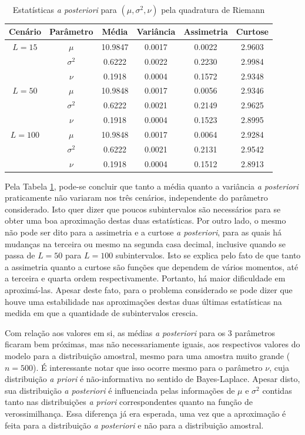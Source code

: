 \begin{table}[htb]
	\caption{Estatísticas \textit{a posteriori} para $(\mu, \sigma^2, \nu)$ pela quadratura de Riemann}
	\label{tab1}
	\centering
	\begin{tabular}{cccccc}
		\toprule
		Cenário & Parâmetro & Média & Variância & Assimetria & Curtose \\
		\midrule
		$L = 15$ & $\mu$      & 10.9847 & 0.0017 & 0.0022 & 2.9603 \\
		& $\sigma^2$ &  0.6222 & 0.0022 & 0.2230 & 2.9984 \\
		& $\nu$      &  0.1918 & 0.0004 & 0.1572 & 2.9348 \\
		\midrule
		$L = 50$ & $\mu$      & 10.9848 & 0.0017 & 0.0056 & 2.9346 \\
		& $\sigma^2$ &  0.6222 & 0.0021 & 0.2149 & 2.9625 \\
		& $\nu$      &  0.1918 & 0.0004 & 0.1523 & 2.8995 \\
		\midrule
		$L = 100$ & $\mu$      & 10.9848 & 0.0017 & 0.0064 & 2.9284 \\
		& $\sigma^2$ &  0.6222 & 0.0021 & 0.2131 & 2.9542 \\
		& $\nu$      &  0.1918 & 0.0004 & 0.1512 & 2.8913 \\
		\bottomrule
	\end{tabular}
\end{table}

Pela Tabela \ref{tab1}, pode-se concluir que tanto a média quanto a variância \textit{a posteriori} praticamente não variaram nos três cenários, independente do parâmetro considerado. Isto quer dizer que poucos subintervalos são necessários para se obter uma boa aproximação destas duas estatísticas. Por outro lado, o mesmo não pode ser dito para a assimetria e a curtose \textit{a posteriori}, para as quais há mudanças na terceira ou mesmo na segunda casa decimal, inclusive quando se passa de $L = 50$ para $L = 100$ subintervalos. Isto se explica pelo fato de que tanto a assimetria quanto a curtose são funções que dependem de vários momentos, até a terceira e quarta ordem respectivamente. Portanto, há maior dificuldade em aproximá-las. Apesar deste fato, para o problema considerado se pode dizer que houve uma estabilidade nas aproximações destas duas últimas estatísticas na medida em que a quantidade de subintervalos crescia.

Com relação aos valores em si, as médias \textit{a posteriori} para os 3 parâmetros ficaram bem próximas, mas não necessariamente iguais, aos respectivos valores do modelo para a distribuição amostral, mesmo para uma amostra muito grande ($n = 500$). É interessante notar que isso ocorre mesmo para o parâmetro $\nu$, cuja distribuição \textit{a priori} é não-informativa no sentido de Bayes-Laplace. Apesar disto, sua distribuição \textit{a posteriori} é influenciada pelas informações de $\mu$ e $\sigma^2$ contidas tanto nas distribuições \textit{a priori} correspondentes quanto na função de verossimilhança. Essa diferença já era esperada, uma vez que a aproximação é feita para a distribuição \textit{a posteriori} e não para a distribuição amostral.


